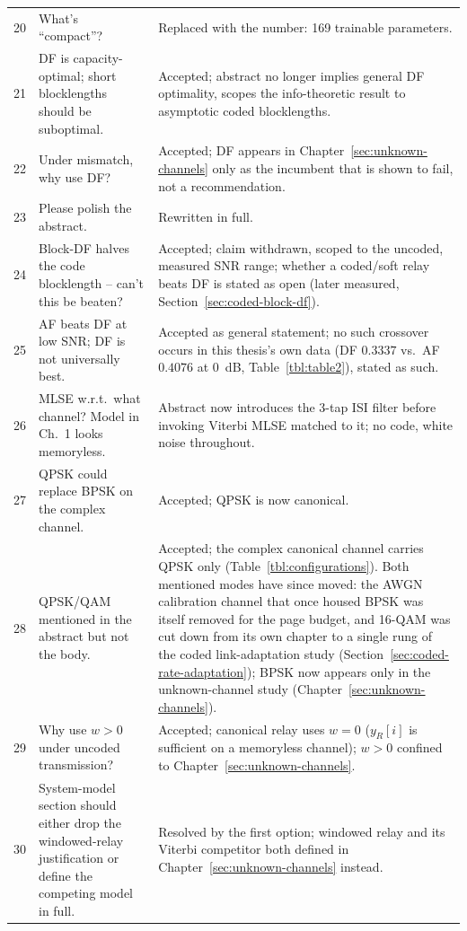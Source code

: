 \begin{longtable}[]{@{}p{0.5cm}p{6.3cm}p{7.2cm}@{}}
20 & What's ``compact''? & Replaced with the number: 169 trainable parameters. \\
21 & DF is capacity-optimal; short blocklengths should be suboptimal. & Accepted; abstract no longer implies general DF optimality, scopes the info-theoretic result to asymptotic coded blocklengths. \\
22 & Under mismatch, why use DF? & Accepted; DF appears in Chapter~\ref{sec:unknown-channels} only as the incumbent that is shown to fail, not a recommendation. \\
23 & Please polish the abstract. & Rewritten in full. \\
24 & Block-DF halves the code blocklength -- can't this be beaten? & Accepted; claim withdrawn, scoped to the uncoded, measured SNR range; whether a coded/soft relay beats DF is stated as open (later measured, Section~\ref{sec:coded-block-df}). \\
25 & AF beats DF at low SNR; DF is not universally best. & Accepted as general statement; no such crossover occurs in this thesis's own data (DF $0.3337$ vs.\ AF $0.4076$ at 0~dB, Table~\ref{tbl:table2}), stated as such. \\
26 & MLSE w.r.t.\ what channel? Model in Ch.~1 looks memoryless. & Abstract now introduces the 3-tap ISI filter before invoking Viterbi MLSE matched to it; no code, white noise throughout. \\
27 & QPSK could replace BPSK on the complex channel. & Accepted; QPSK is now canonical. \\
28 & QPSK/QAM mentioned in the abstract but not the body. & Accepted; the complex canonical channel carries QPSK only (Table~\ref{tbl:configurations}). Both mentioned modes have since moved: the AWGN calibration channel that once housed BPSK was itself removed for the page budget, and 16-QAM was cut down from its own chapter to a single rung of the coded link-adaptation study (Section~\ref{sec:coded-rate-adaptation}); BPSK now appears only in the unknown-channel study (Chapter~\ref{sec:unknown-channels}). \\
29 & Why use $w{>}0$ under uncoded transmission? & Accepted; canonical relay uses $w{=}0$ ($y_R[i]$ is sufficient on a memoryless channel); $w{>}0$ confined to Chapter~\ref{sec:unknown-channels}. \\
30 & System-model section should either drop the windowed-relay justification or define the competing model in full. & Resolved by the first option; windowed relay and its Viterbi competitor both defined in Chapter~\ref{sec:unknown-channels} instead. \\

\end{longtable}
